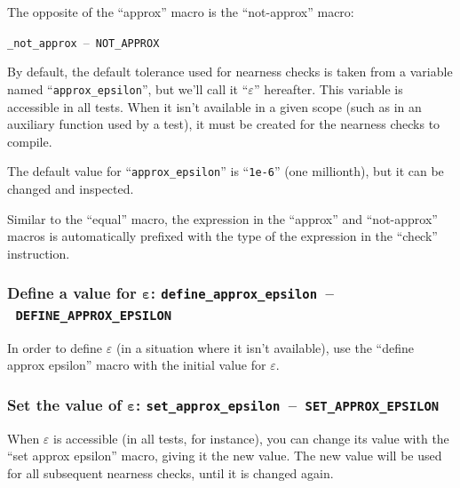 \documentclass[twoside, a4paper, article]{memoir}
\newcommand*\testudocolor{\color{red!80!blue}}
\newcommand*\testudo[1]{\texttt{\testudocolor{}#1}}
\newcommand*\testudopair[2]{\testudo{#1}~--~\testudo{#2}}
\newcommand\subsubsectiontestudopair[3]{%
  \subsubsection[#1]{#1: \testudopair{#2}{#3}}}
\newcommand\typesetexample[1]{%
  \typesetexamplesource{#1}
}
\newcommand\typesetexampleandreport[1]{%
  \typesetexamplesource{#1}
  \typesetexamplereport{#1}
}
\providecommand\typesetexamplereport[1]{%
}
\providecommand\typesetexamplesource[1]{%
}
\begin{document}
\typesetexampleandreport{check-approx}

The opposite of the ``approx'' macro is the ``not-approx'' macro:
\begin{center}
  \testudopair{\_not\_approx}{NOT\_APPROX}
\end{center}

\typesetexampleandreport{check-not-approx}

By default, the default tolerance used for nearness checks is taken from a
variable named ``\texttt{approx\_epsilon}'', but we'll call it
``$\varepsilon$'' hereafter.  This variable is accessible in all tests.  When
it isn't available in a given scope (such as in an auxiliary function used by a
test), it must be created for the nearness checks to compile.

The default value for ``\texttt{approx\_epsilon}'' is ``\texttt{1e-6}'' (one
millionth), but it can be changed and inspected.

Similar to the ``equal'' macro, the expression in the ``approx'' and
``not-approx'' macros is automatically prefixed with the type of the expression
in the ``check'' instruction.




\subsubsectiontestudopair{Define a value for $\bm{\varepsilon}$}%
  {define\_approx\_epsilon}{DEFINE\_APPROX\_EPSILON}
\label{sec:define-value-epsilon}

In order to define $\varepsilon$ (in a situation where it isn't available), use
the ``define approx epsilon'' macro with the initial value for $\varepsilon$.

\typesetexampleandreport{define-approx-epsilon}

\subsubsectiontestudopair{Set the value of $\bm{\varepsilon}$}%
  {set\_approx\_epsilon}{SET\_APPROX\_EPSILON}
\label{sec:set-value-epsilon}

When $\varepsilon$ is accessible (in all tests, for instance), you can change
its value with the ``set approx epsilon'' macro, giving it the new value.  The
new value will be used for all subsequent nearness checks, until it is changed
again.
\end{document}
